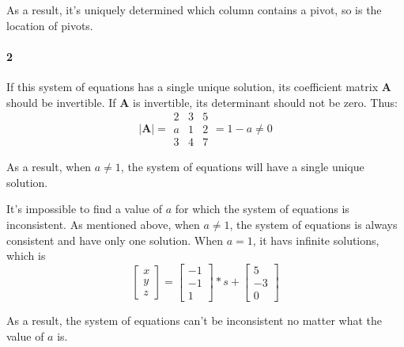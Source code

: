 \documentclass[22pt]{article}
\begin{document}
		As a result, it's uniquely determined which column contains a pivot, so is the location of pivots.

	\paragraph{2} If this system of equations has a single unique solution, its  coefficient matrix $\mathbf{A}$ should be invertible. If $\mathbf{A}$ is invertible, its determinant should not be zero. Thus:
		\begin{equation}
			|\mathbf{A}| = 
			\begin{array}{|ccc|}
			2 & 3 &5\\
			a & 1 & 2\\
			3 & 4 &7
			\end{array}
			= 1- a \not= 0
		\end{equation}

	As a result, when $a \not= 1$, the system of equations will have a single unique solution.

	It's impossible to find a value of $a$ for which the system of equations is inconsistent. As mentioned above, when $a \not= 1$, the system of equations is always consistent and have only one solution. When $a = 1$, it havs infinite solutions, which is 
		\begin{equation}
			\left[ \begin{array}{c}
			 x\\ y\\ z 
			 \end{array} \right]
			 = 
			 \left[ \begin{array}{c}
			 -1\\ -1\\ 1 
			 \end{array} \right] *s +
			 \left[ \begin{array}{c}
			 5\\ -3\\ 0 
			 \end{array} \right]
		\end{equation}

	As a result, the system of equations can't be inconsistent no matter what the value of $a$ is.
\end{document}
